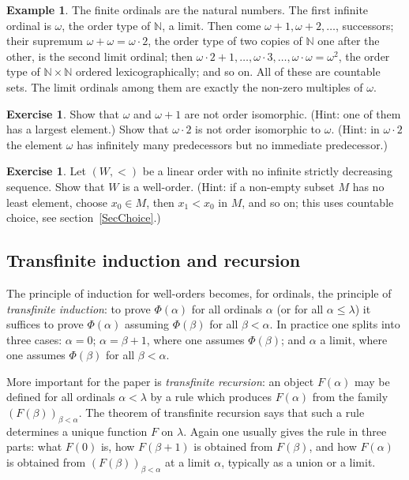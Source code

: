\documentclass[12pt]{article}
\theoremstyle{definition}
\newtheorem{example}[theorem]{Example}
\newtheorem{exercise}[theorem]{Exercise}
\theoremstyle{remark}
\newcommand{\NN}{\mathbb{N}}
\begin{document}
\begin{example}\label{SmallOrdinals} The finite ordinals are the natural
    numbers. The first infinite ordinal is $\omega$, the order type of $\NN$,
    a limit. Then come $\omega+1,\omega+2,\ldots$, successors; their supremum
    $\omega+\omega=\omega\cdot 2$, the order type of two copies of $\NN$ one
    after the other, is the second limit ordinal; then
    $\omega\cdot 2+1,\ldots,\omega\cdot 3,\ldots,\omega\cdot\omega=\omega^2$, the
    order type of $\NN\times\NN$ ordered lexicographically; and so on. All of
    these are countable sets. The limit ordinals among them are exactly the
    non-zero multiples of $\omega$.
\end{example}

\begin{exercise} Show that $\omega$ and $\omega+1$ are not order isomorphic.
    (Hint: one of them has a largest element.) Show that $\omega\cdot 2$ is
    not order isomorphic to $\omega$. (Hint: in $\omega\cdot 2$ the element
    $\omega$ has infinitely many predecessors but no immediate predecessor.)
\end{exercise}

\begin{exercise} Let $(W,<)$ be a linear order with no infinite strictly
    decreasing sequence. Show that $W$ is a well-order. (Hint: if a non-empty
    subset $M$ has no least element, choose $x_0\in M$, then $x_1<x_0$ in
    $M$, and so on; this uses countable choice, see
    section~\ref{SecChoice}.)
\end{exercise}

\subsection{Transfinite induction and recursion}

The principle of induction for well-orders becomes, for ordinals, the
principle of \emph{transfinite induction}: to prove $\Phi(\alpha)$ for all
ordinals $\alpha$ (or for all $\alpha\leq\lambda$) it suffices to prove
$\Phi(\alpha)$ assuming $\Phi(\beta)$ for all $\beta<\alpha$. In practice one
splits into three cases: $\alpha=0$; $\alpha=\beta+1$, where one assumes
$\Phi(\beta)$; and $\alpha$ a limit, where one assumes $\Phi(\beta)$ for all
$\beta<\alpha$.

More important for the paper is \emph{transfinite recursion}: an object
$F(\alpha)$ may be defined for all ordinals $\alpha<\lambda$ by a rule which
produces $F(\alpha)$ from the family ${(F(\beta))}_{\beta<\alpha}$. The
theorem of transfinite recursion says that such a rule determines a unique
function $F$ on $\lambda$. Again one usually gives the rule in three parts:
what $F(0)$ is, how $F(\beta+1)$ is obtained from $F(\beta)$, and how
$F(\alpha)$ is obtained from ${(F(\beta))}_{\beta<\alpha}$ at a limit
$\alpha$, typically as a union or a limit.
\end{document}
